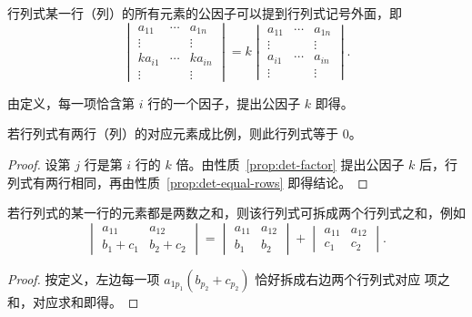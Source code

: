 \begin{property}[行的公因子可提出]\label{prop:det-factor}
行列式某一行（列）的所有元素的公因子可以提到行列式记号外面，即
\[
  \begin{vmatrix}
    a_{11} & \cdots & a_{1n} \\
    \vdots &        & \vdots \\
    ka_{i1} & \cdots & ka_{in} \\
    \vdots &        & \vdots
  \end{vmatrix}
  =k
  \begin{vmatrix}
    a_{11} & \cdots & a_{1n} \\
    \vdots &        & \vdots \\
    a_{i1} & \cdots & a_{in} \\
    \vdots &        & \vdots
  \end{vmatrix}.
\]
\end{property}

由定义，每一项恰含第 $i$ 行的一个因子，提出公因子 $k$ 即得。

\begin{property}[两行成比例则为零]\label{prop:det-proportional}
若行列式有两行（列）的对应元素成比例，则此行列式等于 $0$。
\end{property}
\begin{proof}
设第 $j$ 行是第 $i$ 行的 $k$ 倍。由性质~\ref{prop:det-factor} 提出公因子 $k$
后，行列式有两行相同，再由性质~\ref{prop:det-equal-rows} 即得结论。
\end{proof}

\begin{property}[行可拆分]\label{prop:det-split}
若行列式的某一行的元素都是两数之和，则该行列式可拆成两个行列式之和，例如
\[
  \begin{vmatrix} a_{11} & a_{12} \\ b_1+c_1 & b_2+c_2 \end{vmatrix}
  =\begin{vmatrix} a_{11} & a_{12} \\ b_1 & b_2 \end{vmatrix}
  +\begin{vmatrix} a_{11} & a_{12} \\ c_1 & c_2 \end{vmatrix}.
\]
\end{property}
\begin{proof}
按定义，左边每一项 $a_{1p_1}(b_{p_2}+c_{p_2})$ 恰好拆成右边两个行列式对应
项之和，对应求和即得。
\end{proof}

